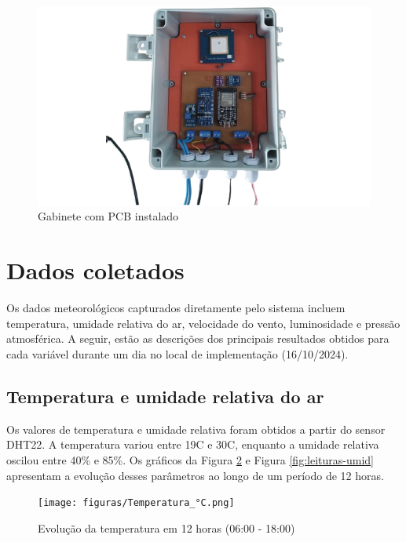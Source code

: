 \begin{figure}[!htb] \centering
\caption{Gabinete com PCB instalado} \label{figura:gab-proj}
\begin{varwidth}{\linewidth}
\includegraphics[width=16cm]{figuras/gab-proj.png}
\end{varwidth}
\end{figure}

\section{Dados coletados}

Os dados meteorológicos capturados diretamente pelo sistema incluem temperatura, umidade relativa do ar, velocidade do vento, luminosidade e pressão atmosférica. A seguir, estão as descrições dos principais resultados obtidos para cada variável durante um dia no local de implementação (16/10/2024).

\subsection{Temperatura e umidade relativa do ar}
Os valores de temperatura e umidade relativa foram obtidos a partir do sensor DHT22. A temperatura variou entre 19\textdegree C e 30\textdegree C, enquanto a umidade relativa oscilou entre 40\% e 85\%. Os gráficos da Figura \ref{fig:leituras-temp} e Figura \ref{fig:leituras-umid} apresentam a evolução desses parâmetros ao longo de um período de 12 horas.

\begin{figure}[!htb] \centering
  \caption{Evolução da temperatura em 12 horas (06:00 - 18:00)} \label{fig:leituras-temp}
  \begin{varwidth}{\linewidth}
    \texttt{[image: figuras/Temperatura\_°C.png]}
  \end{varwidth}
\end{figure}

